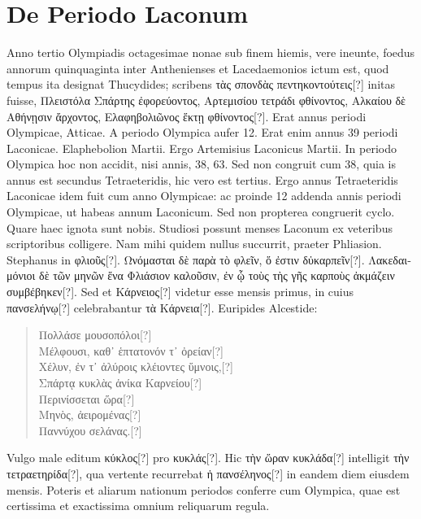 \section{De Periodo Laconum}
Anno tertio Olympiadis octagesimae nonae sub finem hiemis,
vere ineunte, foedus annorum quinquaginta inter Anthenienses
et Lacedaemonios ictum est, quod tempus ita designat Thucydides;
scribens \textgreek{τὰς σπονδὰς πεντηκοντούτεις[?]} initas fuisse,
 \textgreek{Πλειστόλα Σπάρτης
ἐφορεύοντος, Αρτεμισίου τετράδι φθίνοντος, Αλκαίου δὲ Αθήνῃσιν ἄρχοντος,
 Ελαφηβολιῶνος
ἕκτῃ φθίνοντος[?]}.
Erat annus  periodi Olympicae,  Atticae.
A periodo Olympica aufer 12.
Erat enim annus 39 periodi Laconicae.
Elaphebolion  Martii.
Ergo Artemisius Laconicus  Martii.
In periodo Olympica hoc non accidit, nisi annis, 38, 63.
Sed non congruit
cum 38, quia is annus est secundus Tetraeteridis, hic vero est
tertius.
%
Ergo annus Tetraeteridis Laconicae idem fuit cum
 anno Olympicae:
ac proinde 12 addenda annis periodi Olympicae, ut habeas
annum Laconicum.
Sed non propterea congruerit cyclo.
Quare
haec ignota sunt nobis.
Studiosi possunt menses Laconum ex veteribus
scriptoribus colligere.
Nam mihi quidem nullus succurrit, praeter
Phliasion.
Stephanus in \textgreek{φλιοῦς[?]}.
\textgreek{Ωνόμασται δὲ παρὰ τὸ φλεῖν, ὅ ἐστιν δὐκαρπεῖν[?]}.
\textgreek{Λακεδαιμόνιοι δὲ τῶν μηνῶν ἕνα Φλιάσιον καλοῦσιν,
 ἐν ᾧ τοὺς τὴς γῆς
καρποὺς ἀκμάζειν συμβέβηκεν[?]}.
Sed et \textgreek{Κάρνειος[?]} videtur esse mensis primus,
in cuius \textgreek{πανσελήνῳ[?]} celebrabantur \textgreek{τὰ Κάρνεια[?]}.
Euripides Alcestide:
\begin{verse}
  \textgreek{Πολλάσε μουσοπόλοι[?]}\\
  \textgreek{Μέλφουσι, καθ᾽ ἑπτατονόν τ᾽ ὀρείαν[?]}\\
  \textgreek{Χέλυν, ἐν τ᾿ ἀλύροις κλέιοντες ὕμνοις,[?]}\\
  \textgreek{Σπάρτᾳ κυκλὰς ἁνίκα Καρνείου[?]}\\
  \textgreek{Περινίσσεται ὥρα[?]}\\
  \textgreek{Μηνὸς, ἀειρομένας[?]}\\
  \textgreek{Παννύχου σελάνας.[?]}
\end{verse}
Vulgo male editum \textgreek{κύκλος[?]} pro \textgreek{κυκλάς[?]}.
Hic \textgreek{τὴν ὥραν κυκλάδα[?]} intelligit
\textgreek{τὴν τετραετηρίδα[?]}, qua vertente recurrebat
 \textgreek{ἡ πανσέληνος[?]} in eandem
diem eiusdem mensis.
Poteris et aliarum nationum periodos
conferre cum Olympica, quae est certissima et exactissima omnium
reliquarum regula.
\vspace*{\fill}

